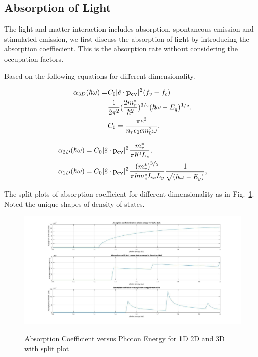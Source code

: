 \subsection{Absorption of Light}

The light and matter interaction includes absorption, spontaneous emission and
stimulated emission, we first discuss the absorption of light by introducing
the absorption coeffiecient. This is the absorption rate without considering
the occupation factors.

Based on the following equations for different dimensionality.


\begin{equation}
\begin{aligned}
    \alpha_{3D}(\hbar\omega)= & C_0{|\hat{e}\cdot\bf{p}_{cv}|^2}(f_v-f_c)\\
    & \frac{1}{2\pi^2}(\frac{2m_r^\ast}{\hbar^2})^{3/_2}(\hbar\omega-E_g)^{1/_2},\\
    & C_0=\frac{\pi{e^2}}{n_r\epsilon_0{c}{m_0^2}\omega},
\end{aligned}
\label{eq:two}
\end{equation}

\begin{eqnarray}
\begin{aligned}
& \alpha_{2D}(\hbar\omega)=C_0{|\hat{e}\cdot\bf{p}_{cv}|^2}\frac{m_r^\ast}{\pi\hbar^2{L_z}},
\\
& \alpha_{1D}(\hbar\omega)=C_0{|\hat{e}\cdot\bf{p}_{cv}|^2}\frac{{(m_r^\ast)}^{3/_2}}{\pi\hbar{m_e^\ast}{L_x}{L_y}}\frac{1}{\sqrt{(\hbar\omega-E_g)}},
\end{aligned}
\label{eq:five}
\end{eqnarray}

The split plots of absorption coefficient for different dimensionality as in
Fig.~\ref{absrate_split}. Noted the unique shapes of density of states.

\begin{figure}
  \caption{Absorption Coefficient versus Photon Energy for 1D 2D and 3D with split plot}
  \centering
  \includegraphics[width=\textwidth]{pictures/LT/absrate_split}
  \label{absrate_split}
\end{figure}

